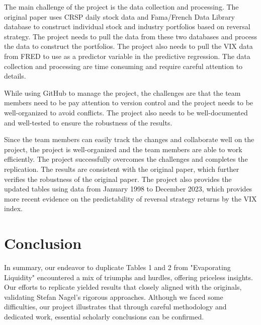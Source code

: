 \documentclass[11pt]{article}
\begin{document}
The main challenge of the project is the data collection and processing. The original paper uses 
CRSP daily stock data and Fama/French Data Library database to construct individual stock and 
industry portfolios based on reversal strategy. The project needs to pull the data from these two 
databases and process the data to construct the portfolios. The project also needs to pull the 
VIX data from FRED to use as a predictor variable in the predictive regression. The data collection 
and processing are time consuming and require careful attention to details.

While using GitHub to manage the project, the challenges are that the team members need to be pay 
attention to version control and the project needs to be well-organized to avoid conflicts. The
project also needs to be well-documented and well-tested to ensure the robustness of the results.

Since the team members can easily track the changes and collaborate well on the project, 
the project is well-organized and the team members are able to work efficiently. The project 
successfully overcomes the challenges and completes the replication. The results are consistent 
with the original paper, which further verifies the robustness of the original paper. The project 
also provides the updated tables using data from January 1998 to December 2023, which provides 
more recent evidence on the predictability of reversal strategy returns by the VIX index.


\section{Conclusion}
In summary, our endeavor to duplicate Tables 1 and 2 from "Evaporating Liquidity" encountered a mix of triumphs and hurdles, 
offering priceless insights. Our efforts to replicate yielded results that closely aligned with the originals, 
validating Stefan Nagel's rigorous approaches. Although we faced some difficulties, 
our project illustrates that through careful methodology and dedicated work, essential scholarly conclusions can be confirmed.


\newpage


\end{document}
